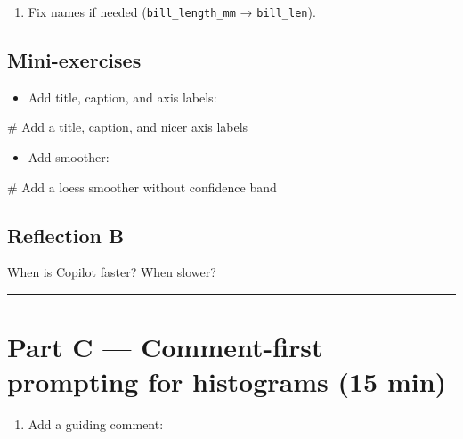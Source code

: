\documentclass[
  letterpaper,
  DIV=11,
  numbers=noendperiod]{scrreprt}
\newenvironment{Shaded}{\begin{snugshade}}{\end{snugshade}}
\newcommand{\CommentTok}[1]{\textcolor[rgb]{0.37,0.37,0.37}{#1}}
\providecommand{\tightlist}{%
  \setlength{\itemsep}{0pt}\setlength{\parskip}{0pt}}
\begin{document}
\begin{enumerate}
\def\labelenumi{\arabic{enumi}.}
\setcounter{enumi}{3}
\tightlist
\item
  Fix names if needed (\texttt{bill\_length\_mm} → \texttt{bill\_len}).
\end{enumerate}

\subsection{Mini-exercises}\label{mini-exercises}

\begin{itemize}
\tightlist
\item
  Add title, caption, and axis labels:
\end{itemize}

\begin{Shaded}
\begin{Highlighting}[]
\CommentTok{\# Add a title, caption, and nicer axis labels}
\end{Highlighting}
\end{Shaded}

\begin{itemize}
\tightlist
\item
  Add smoother:
\end{itemize}

\begin{Shaded}
\begin{Highlighting}[]
\CommentTok{\# Add a loess smoother without confidence band}
\end{Highlighting}
\end{Shaded}

\subsection{Reflection B}\label{reflection-b}

When is Copilot faster? When slower?

\begin{center}\rule{0.5\linewidth}{0.5pt}\end{center}

\section{Part C --- Comment-first prompting for histograms (15
min)}\label{part-c-comment-first-prompting-for-histograms-15-min}

\begin{enumerate}
\def\labelenumi{\arabic{enumi}.}
\tightlist
\item
  Add a guiding comment:
\end{enumerate}
\end{document}
